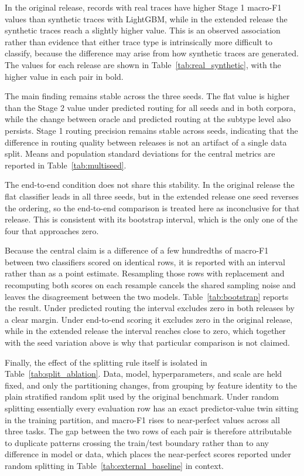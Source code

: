 \documentclass{IEEEoj}
\begin{document}
In the original release, records with real traces have higher Stage 1 macro-F1
values than synthetic traces with LightGBM, while in the extended release the
synthetic traces reach a slightly higher value. This is an observed association
rather than evidence that either trace type is intrinsically more difficult to
classify, because the difference may arise from how synthetic traces are
generated. The values for each release are shown in
Table~\ref{tab:real_synthetic}, with the higher value in each pair in bold.



The main finding remains stable across the three seeds. The flat value is
higher than the Stage 2 value under predicted routing for all seeds and in both
corpora, while the change between oracle and predicted routing at the subtype level
also persists. Stage 1 routing precision remains stable across seeds,
indicating that the difference in routing quality between releases is not an
artifact of a single data split. Means and population standard deviations for
the central metrics are reported in Table~\ref{tab:multiseed}.

The end-to-end condition does not share this stability. In the original
release the flat classifier leads in all three seeds, but in the extended
release one seed reverses the ordering, so the end-to-end comparison is
treated here as inconclusive for that release. This is consistent with its
bootstrap interval, which is the only one of the four that approaches zero.



Because the central claim is a difference of a few hundredths of macro-F1
between two classifiers scored on identical rows, it is reported with an
interval rather than as a point estimate. Resampling those rows with
replacement and recomputing both scores on each resample cancels the shared
sampling noise and leaves the disagreement between the two models.
Table~\ref{tab:bootstrap} reports the result. Under predicted routing the
interval excludes zero in both releases by a clear margin. Under end-to-end
scoring it excludes zero in the original release, while in the extended
release the interval reaches close to zero, which together with the seed
variation above is why that particular comparison is not claimed.



Finally, the effect of the splitting rule itself is isolated in
Table~\ref{tab:split_ablation}. Data, model, hyperparameters, and scale are
held fixed, and only the partitioning changes, from grouping by feature
identity to the plain stratified random split used by the original benchmark.
Under random splitting essentially every evaluation row has an exact
predictor-value twin sitting in the training partition, and macro-F1 rises to
near-perfect values across all three tasks. The gap between the two rows of
each pair is therefore attributable to duplicate patterns crossing the
train/test boundary rather than to any difference in model or data, which
places the near-perfect scores reported under random splitting in
Table~\ref{tab:external_baseline} in context.
\end{document}
